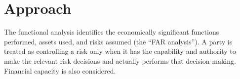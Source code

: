 \section{Approach}
The functional analysis identifies the economically significant functions
performed, assets used, and risks assumed (the ``FAR analysis''). A party is
treated as controlling a risk only when it has the capability and authority to
make the relevant risk decisions and actually performs that decision-making.
Financial capacity is also considered.
